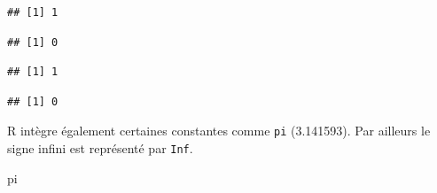\documentclass[
]{book}
\newenvironment{Shaded}{\begin{snugshade}}{\end{snugshade}}
\newcommand{\DecValTok}[1]{\textcolor[rgb]{0.00,0.00,0.81}{#1}}
\newcommand{\NormalTok}[1]{#1}
\newcommand{\OperatorTok}[1]{\textcolor[rgb]{0.81,0.36,0.00}{\textbf{#1}}}
\newcommand{\StringTok}[1]{\textcolor[rgb]{0.31,0.60,0.02}{#1}}
\begin{document}
\begin{Shaded}
\end{Shaded}

\begin{verbatim}
## [1] 1
\end{verbatim}

\begin{Shaded}
\end{Shaded}

\begin{verbatim}
## [1] 0
\end{verbatim}

\begin{Shaded}
\end{Shaded}

\begin{verbatim}
## [1] 1
\end{verbatim}

\begin{Shaded}
\end{Shaded}

\begin{verbatim}
## [1] 0
\end{verbatim}

R intègre également certaines constantes comme \texttt{pi} (3.141593). Par ailleurs le signe infini est représenté par \texttt{Inf}.

\begin{Shaded}
\begin{Highlighting}[]
\NormalTok{pi}
\end{Highlighting}
\end{Shaded}
\end{document}
